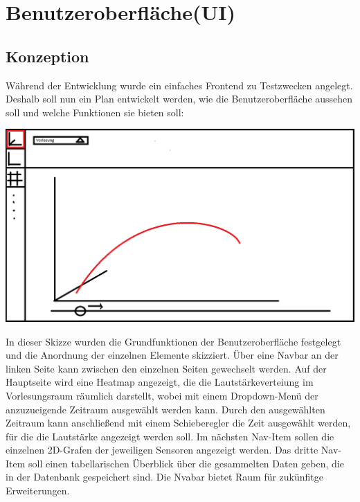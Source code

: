 \chapter{Benutzeroberfläche(UI)}
\section{Konzeption}
Während der Entwicklung wurde ein einfaches Frontend zu Testzwecken angelegt. 
Deshalb soll nun ein Plan entwickelt werden, wie die Benutzeroberfläche aussehen soll und welche Funktionen sie bieten soll:
\begin{center}
  \includegraphics[width=1\textwidth]{../images/UI/SkizzeUI.png}
\end{center}
In dieser Skizze wurden die Grundfunktionen der Benutzeroberfläche festgelegt und die Anordnung der einzelnen Elemente skizziert.
Über eine Navbar an der linken Seite kann zwischen den einzelnen Seiten gewechselt werden. 
Auf der Hauptseite wird eine Heatmap angezeigt, die die Lautstärkeverteiung im Vorlesungsraum räumlich darstellt, wobei mit einem Dropdown-Menü der anzuzueigende Zeitraum ausgewählt werden kann.
Durch den ausgewählten Zeitraum kann anschließend mit einem Schieberegler die Zeit ausgewählt werden, für die die Lautstärke angezeigt werden soll.
Im nächsten Nav-Item sollen die einzelnen 2D-Grafen der jeweiligen Sensoren angezeigt werden. 
Das dritte Nav-Item soll einen tabellarischen Überblick über die gesammelten Daten geben, die in der Datenbank gespeichert sind.
Die Nvabar bietet Raum für zukünfitge Erweiterungen.
